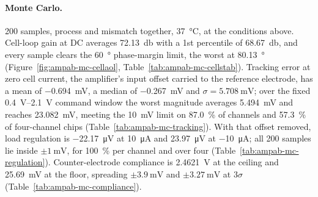 %
%
%

\paragraph{Monte Carlo.} 200 samples, process and mismatch together,
\SI{37}{\celsius}, at the conditions above. Cell-loop gain at DC averages
\SI{72.13}{\decibel} with a 1st percentile of \SI{68.67}{\decibel}, and every sample
clears the \SI{60}{\degree} phase-margin limit, the worst at \SI{80.13}{\degree}
(Figure~\ref{fig:ampab-mc-cellaol}, Table~\ref{tab:ampab-mc-cellstab}). Tracking error
at zero cell current, the amplifier's input offset carried to the reference
electrode, has a mean of \SI{-0.694}{\milli\volt}, a median of
\SI{-0.267}{\milli\volt} and \(\sigma = \SI{5.708}{\milli\volt}\); over the fixed
\SIrange{0.4}{2.1}{\volt} command window the worst magnitude averages
\SI{5.494}{\milli\volt} and reaches \SI{23.082}{\milli\volt}, meeting the
\SI{10}{\milli\volt} limit on \SI{87.0}{\percent} of channels and \SI{57.3}{\percent} of
four-channel chips (Table~\ref{tab:ampab-mc-tracking}). With that offset removed, load
regulation is \SI{-22.17}{\micro\volt} at \SI{+10}{\micro\ampere} and
\SI{23.97}{\micro\volt} at \SI{-10}{\micro\ampere}; all 200 samples lie inside
\(\pm\SI{1}{\milli\volt}\), for \SI{100}{\percent} per channel and over four
(Table~\ref{tab:ampab-mc-regulation}). Counter-electrode compliance is
\SI{2.4621}{\volt} at the ceiling and \SI{25.69}{\milli\volt} at the floor, spreading
\(\pm\SI{3.9}{\milli\volt}\) and \(\pm\SI{3.27}{\milli\volt}\) at \(3\sigma\)
(Table~\ref{tab:ampab-mc-compliance}).
